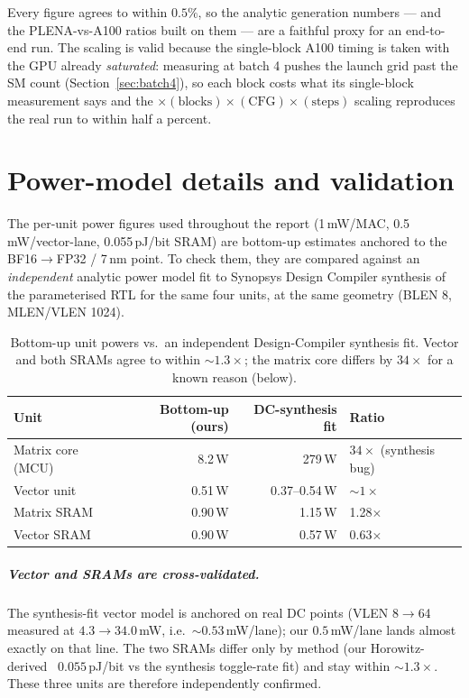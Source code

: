\documentclass[11pt]{report}
\begin{document}
Every figure agrees to within $0.5\%$, so the analytic generation numbers
--- and the PLENA-vs-A100 ratios built on them --- are a faithful proxy for
an end-to-end run. The scaling is valid because the single-block A100 timing
is taken with the GPU already \emph{saturated}: measuring at batch 4 pushes
the launch grid past the SM count (Section~\ref{sec:batch4}), so each block
costs what its single-block measurement says and the
$\times(\text{blocks})\times(\text{CFG})\times(\text{steps})$ scaling
reproduces the real run to within half a percent.

\chapter{Power-model details and validation}
\label{app:power}

The per-unit power figures used throughout the report (1\,mW/MAC,
0.5\,mW/vector-lane, 0.055\,pJ/bit SRAM) are bottom-up estimates anchored to
the BF16$\to$FP32 / 7\,nm point. To check them, they are compared against an
\emph{independent} analytic power model fit to Synopsys Design Compiler
synthesis of the parameterised RTL for the same four units, at the same
geometry (BLEN 8, MLEN/VLEN 1024).

\begin{table}[h]
\centering
\caption{Bottom-up unit powers vs.\ an independent Design-Compiler synthesis
fit. Vector and both SRAMs agree to within ${\sim}1.3\times$; the matrix
core differs by $34\times$ for a known reason (below).}
\label{tab:power-validation}
\begin{tabular}{@{}lrrl@{}}
\toprule
Unit & Bottom-up (ours) & DC-synthesis fit & Ratio \\
\midrule
Matrix core (MCU) & 8.2\,W & 279\,W & $34\times$ (synthesis bug) \\
Vector unit & 0.51\,W & 0.37--0.54\,W & ${\sim}1\times$ \\
Matrix SRAM & 0.90\,W & 1.15\,W & 1.28$\times$ \\
Vector SRAM & 0.90\,W & 0.57\,W & 0.63$\times$ \\
\bottomrule
\end{tabular}
\end{table}

\paragraph{Vector and SRAMs are cross-validated.} The synthesis-fit vector
model is anchored on real DC points (VLEN 8$\to$64 measured at
$4.3\to34.0$\,mW, i.e.\ ${\sim}0.53$\,mW/lane); our $0.5$\,mW/lane lands
almost exactly on that line. The two SRAMs differ only by method (our
Horowitz-derived~\cite{horowitz2014energy} $0.055$\,pJ/bit vs the synthesis
toggle-rate fit) and stay within ${\sim}1.3\times$. These three units are therefore independently
confirmed.
\end{document}
